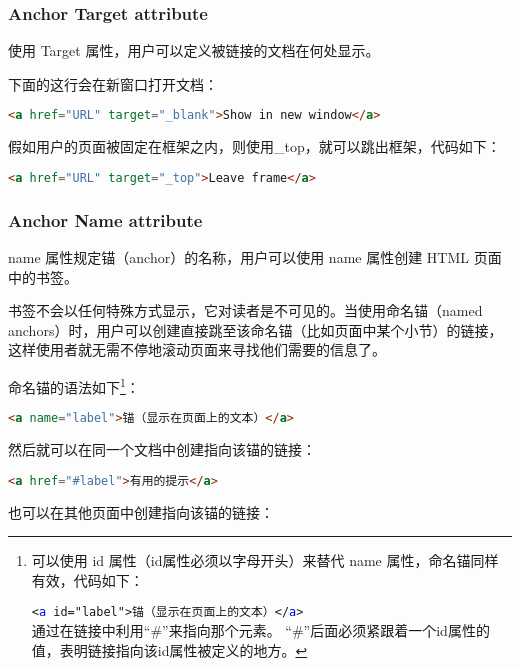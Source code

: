 \subsubsection{Anchor Target attribute}

使用 Target 属性，用户可以定义被链接的文档在何处显示。

下面的这行会在新窗口打开文档：

\begin{lstlisting}[language=HTML]
	<a href="URL" target="_blank">Show in new window</a>
\end{lstlisting}

假如用户的页面被固定在框架之内，则使用\_top，就可以跳出框架，代码如下：

\begin{lstlisting}[language=HTML]
	<a href="URL" target="_top">Leave frame</a>
\end{lstlisting}

\subsubsection{Anchor Name attribute}

name 属性规定锚（anchor）的名称，用户可以使用 name 属性创建 HTML 页面中的书签。

书签不会以任何特殊方式显示，它对读者是不可见的。当使用命名锚（named anchors）时，用户可以创建直接跳至该命名锚（比如页面中某个小节）的链接，这样使用者就无需不停地滚动页面来寻找他们需要的信息了。

命名锚的语法如下\footnote{ {\raggedright 可以使用 id 属性（id属性必须以字母开头）来替代 name 属性，命名锚同样有效，代码如下：\\} {\centering \texttt{<\textcolor{Blue}{a} id="label">锚（显示在页面上的文本）</\textcolor{Blue}{a}>} \\}  \indent \indent 通过在链接中利用“\#”来指向那个元素。 “\#”后面必须紧跟着一个id属性的值，表明链接指向该id属性被定义的地方。}：

\begin{lstlisting}[language=HTML]
	<a name="label">锚（显示在页面上的文本）</a>
\end{lstlisting}


然后就可以在同一个文档中创建指向该锚的链接：

\begin{lstlisting}[language=HTML]
	<a href="#label">有用的提示</a>
\end{lstlisting}


也可以在其他页面中创建指向该锚的链接：

